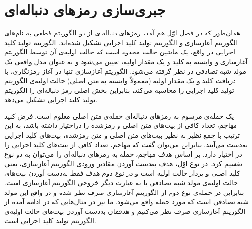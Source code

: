 \section{جبری‌سازی رمزهای دنباله‌ای}
همان‌طور که در فصل اوّل هم آمد، رمزهای دنباله‌ای از دو الگوریتم قطعی به نام‌های الگوریتم آغازسازی و الگوریتم تولید کلید اجرایی تشکیل شده‌اند. الگوریتم تولید کلید اجرایی در واقع، یک ماشین حالت محدود
است که حالت اولیه‌ی آن توسط الگوریتم آغازسازی و وابسته به کلید و یک مقدار اولیه، تعیین می‌شود و به عنوان مدل واقعی یک مولد شبه تصادفی در نظر گرفته می‌شود. الگوریتم آغازسازی تنها در آغاز رمزنگاری، با دریافت کلید و یک مقدار اولیه (معمولاً وابسته به متن اصلی) حالت اولیه‌ی الگوریتم تولید کلید اجرایی را محاسبه می‌کند، بنابراین بخش اصلی رمز دنباله‌ای را الگوریتم تولید کلید اجرایی تشکیل می‌دهد.

یک حمله‌ی مرسوم به رمزهای دنباله‌ای حمله‌ی متن اصلی معلوم است. فرض کنید مهاجم، تعداد کافی از بیت‌های متن اصلی و رمزشده را دراختیار داشته باشد، به این ترتیب با جمع نظیر به نظیر بیت‌های متن اصلی و متن رمزشده، بیت‌های کلید اجرایی به‌دست می‌آیند. بنابراین  می‌توان گفت که مهاجم، تعداد کافی از بیت‌های کلید اجرایی را در اختیار دارد.  بر اساس هدف مهاجم، حمله به رمزهای دنباله‌ای را می‌توان به دو نوع تقسیم کرد. در نوع اوّل، هدف به‌دست آوردن مقادیر ورودی الگوریتم آغازسازی، یعنی کلید اصلی و بردار حالت اولیه است و در نوع دوم هدف فقط به‌دست آوردن بیت‌های حالت اولیه‌ی مولد شبه تصادفی یا به عبارت دیگر خروجی الگوریتم آغازسازی است. بنابراین در حمله‌ی نوع  دوم از الگوریتم آغازسازی صرف نظر شده و در واقع این مولد شبه تصادفی است که مورد حمله واقع می‌شود. ما نیز در مثال‌هایی که در ادامه آمده از الگوریتم آغازسازی صرف نظر می‌کنیم و هدفمان به‌دست آوردن بیت‌های حالت اولیه‌ی الگوریتم تولید کلید اجرایی است.

